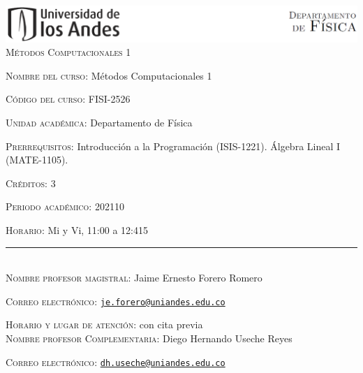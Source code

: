 \documentclass[letterpaper,10pt,onecolumn]{article}
\begin{document}
\begin{center}

\includegraphics[width=490pt]{header.png}\\[0.5cm]

\textsc{\LARGE M\'etodos Computacionales 1}\\[0.1cm]

\end{center}

\large \noindent\textsc{Nombre del curso:}  M\'etodos Computacionales 1 %
  
\noindent\textsc{C\'odigo del curso:}  FISI-2526 %

\noindent\textsc{Unidad acad\'emica:} Departamento de F\'isica

\noindent\textsc{Prerrequisitos}: Introducci\'on a la Programaci\'on
(ISIS-1221). \'Algebra Lineal I (MATE-1105). 

\noindent\textsc{Cr\'editos}: 3

\noindent\textsc{Periodo acad\'emico:} 202110 %

\noindent\textsc{Horario:} Mi y Vi, 11:00 a 12:415

\noindent\rule{\textwidth}{1pt}\\[-0.3cm]

\normalsize \noindent\textsc{Nombre profesor magistral:}
Jaime Ernesto Forero Romero

\noindent\textsc{Correo electr\'onico:}
\href{mailto:je.forero@uniandes.edu.co}{\nolinkurl{je.forero@uniandes.edu.co}}

\noindent\textsc{Horario y lugar de atenci\'on:} 
con cita previa
\\[-0.1cm]


\normalsize \noindent\textsc{Nombre profesor Complementaria:}
Diego Hernando Useche Reyes

\noindent\textsc{Correo electr\'onico:}
\href{mailto:dh.useche@uniandes.edu.co}{\nolinkurl{dh.useche@uniandes.edu.co}}
\end{document}
